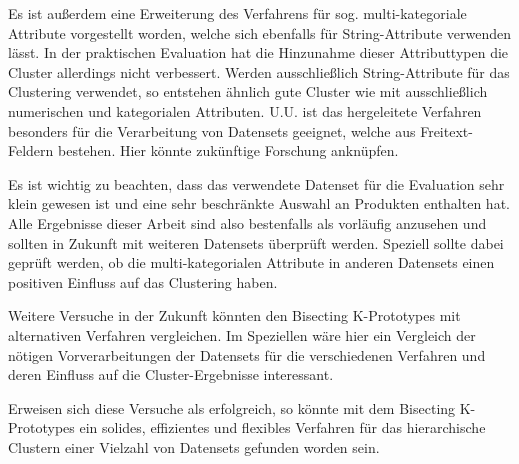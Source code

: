 Es ist außerdem eine Erweiterung des Verfahrens für sog.
multi-kategoriale Attribute vorgestellt worden, welche sich ebenfalls
für String-Attribute verwenden lässt. In der praktischen Evaluation hat
die Hinzunahme dieser Attributtypen die Cluster allerdings nicht
verbessert. Werden ausschließlich String-Attribute für das Clustering
verwendet, so entstehen ähnlich gute Cluster wie mit ausschließlich
numerischen und kategorialen Attributen. U.U. ist das hergeleitete
Verfahren besonders für die Verarbeitung von Datensets geeignet, welche
aus Freitext-Feldern bestehen. Hier könnte zukünftige Forschung
anknüpfen.

Es ist wichtig zu beachten, dass das verwendete Datenset für die
Evaluation sehr klein gewesen ist und eine sehr beschränkte Auswahl an
Produkten enthalten hat. Alle Ergebnisse dieser Arbeit sind also
bestenfalls als vorläufig anzusehen und sollten in Zukunft mit weiteren
Datensets überprüft werden. Speziell sollte dabei geprüft werden, ob die
multi-kategorialen Attribute in anderen Datensets einen positiven
Einfluss auf das Clustering haben.

Weitere Versuche in der Zukunft könnten den Bisecting K-Prototypes mit
alternativen Verfahren vergleichen. Im Speziellen wäre hier ein
Vergleich der nötigen Vorverarbeitungen der Datensets für die
verschiedenen Verfahren und deren Einfluss auf die Cluster-Ergebnisse
interessant.

Erweisen sich diese Versuche als erfolgreich, so könnte mit dem
Bisecting K-Prototypes ein solides, effizientes und flexibles Verfahren
für das hierarchische Clustern einer Vielzahl von Datensets gefunden
worden sein.
